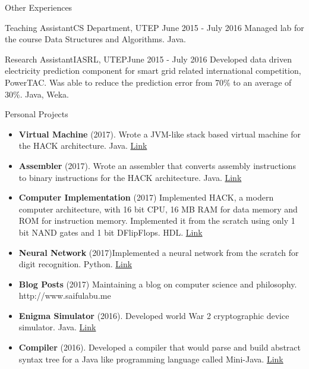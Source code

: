 \documentclass[]{mcdowellcv}
\begin{document}
	\begin{cvsection}{Other Experiences}
		\begin{cvsubsection}{Teaching Assistant}{CS Department, UTEP }{June 2015 - July 2016}
			Managed lab for the course Data Structures and Algorithms. Java.
		\end{cvsubsection}
		\begin{cvsubsection}{Research Assistant}{IASRL, UTEP}{June 2015 - July 2016}
			Developed data driven electricity prediction component for smart grid related international competition, PowerTAC. Was able to reduce the prediction error from 70\% to an average of 30\%. Java, Weka.
		\end{cvsubsection}
	\end{cvsection}
	
	\begin{cvsection}{Personal Projects}
		\begin{cvsubsection}{}{}{}
			\begin{itemize}
				\item \textbf{Virtual Machine} (2017). Wrote a JVM-like stack based virtual machine for the HACK architecture. Java. \href{https://github.com/saifulAbu/Virtual-Machine}{Link} 
				\item \textbf{Assembler} (2017). Wrote an assembler that converts assembly instructions to binary instructions for the HACK architecture. Java. \href{https://github.com/saifulAbu/Assembler}{Link}
				\item\textbf{Computer Implementation} (2017) Implemented HACK, a modern computer architecture, with 16 bit CPU, 16 MB RAM for data memory and ROM for instruction memory. Implemented it from the scratch using only 1 bit NAND gates and 1 bit DFlipFlops. HDL. \href{https://github.com/saifulAbu/HACK-Architecture}{Link}
				\item \textbf{Neural Network} (2017)Implemented a neural network from the scratch for digit recognition. Python. \href{ https://github.com/saifulAbu/NeuralNetwork}{Link}
				\item \textbf{Blog Posts} (2017) Maintaining a blog on computer science and philosophy. http://www.saifulabu.me
				\item \textbf{Enigma Simulator} (2016).  Developed world War 2 cryptographic device simulator.  Java. \href{https://github.com/saifulAbu/Cryptography}{Link}
				\item \textbf{Compiler} (2016). Developed a compiler that would parse and build abstract syntax tree for a Java like programming language called Mini-Java. \href{https://github.com/saifulAbu/MiniJavaCompiler}{Link}  
			\end{itemize}
		\end{cvsubsection}
	\end{cvsection}
	
\end{document}
